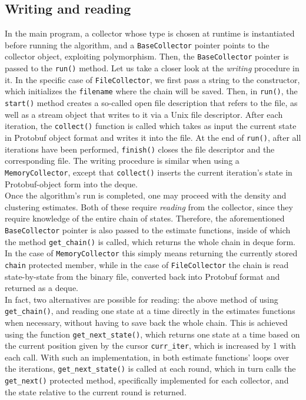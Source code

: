 \subsection{Writing and reading}
In the main program, a collector whose type is chosen at runtime is instantiated before running the algorithm, and a \verb|BaseCollector| pointer points to the collector object, exploiting polymorphism.
Then, the \verb|BaseCollector| pointer is passed to the \verb|run()| method.
Let us take a closer look at the \emph{writing} procedure in it.
In the specific case of \verb|FileCollector|, we first pass a string to the constructor, which initializes the \verb|filename| where the chain will be saved.
Then, in \verb|run()|, the \verb|start()| method creates a so-called open file description that refers to the file, as well as a stream object that writes to it via a Unix file descriptor.
After each iteration, the \verb|collect()| function is called which takes as input the current state in Protobuf object format and writes it into the file.
At the end of \verb|run()|, after all iterations have been performed, \verb|finish()| closes the file descriptor and the corresponding file.
The writing procedure is similar when using a \verb|MemoryCollector|, except that \verb|collect()| inserts the current iteration's state in Protobuf-object form into the deque. \\
Once the algorithm's run is completed, one may proceed with the density and clustering estimates.
Both of these require \emph{reading} from the collector, since they require knowledge of the entire chain of states.
Therefore, the aforementioned \verb|BaseCollector| pointer is also passed to the estimate functions, inside of which the method \verb|get_chain()| is called, which returns the whole chain in deque form.
In the case of \verb|MemoryCollector| this simply means returning the currently stored \verb|chain| protected member, while in the case of \verb|FileCollector| the chain is read state-by-state from the binary file, converted back into Protobuf format and returned as a deque. \\
In fact, two alternatives are possible for reading: the above method of using \verb|get_chain()|, and reading one state at a time directly in the estimates functions when necessary, without having to save back the whole chain. 
This is achieved using the function \verb|get_next_state()|, which returns one state at a time based on the current position given by the cursor \verb|curr_iter|, which is increased by 1 with each call.
With such an implementation, in both estimate functions' loops over the iterations, \verb|get_next_state()| is called at each round, which in turn calls the \verb|get_next()| protected method, specifically implemented for each collector, and the state relative to the current round is returned.
